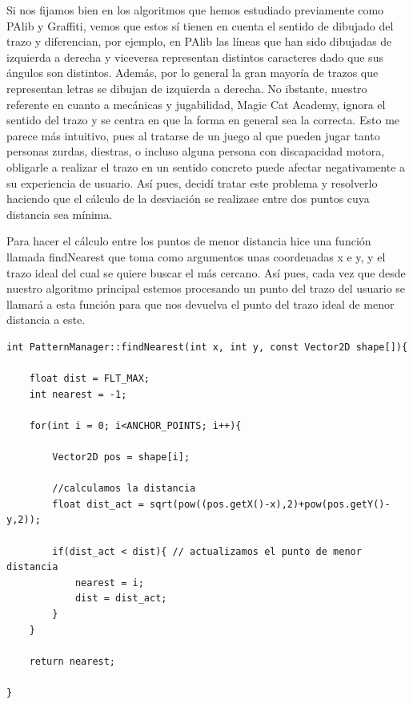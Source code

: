 \vspace{0.5cm}

Si nos fijamos bien en los algoritmos que hemos estudiado previamente como PAlib y Graffiti, vemos que estos sí tienen en cuenta el sentido de dibujado del trazo y diferencian, por ejemplo, en PAlib las líneas que han sido dibujadas de izquierda a derecha y viceversa representan distintos caracteres dado que sus ángulos son distintos. Además, por lo general la gran mayoría de trazos que representan letras se dibujan de izquierda a derecha. No ibstante, nuestro referente en cuanto a mecánicas y jugabilidad, Magic Cat Academy, ignora el sentido del trazo y se centra en que la forma en general sea la correcta. Esto me parece más intuitivo, pues al tratarse de un juego al que pueden jugar tanto personas zurdas, diestras, o incluso alguna persona con discapacidad motora, obligarle a realizar el trazo en un sentido concreto puede afectar negativamente a su experiencia de usuario. Así pues, decidí tratar este problema y resolverlo haciendo que el cálculo de la desviación se realizase entre dos puntos cuya distancia sea mínima.

\vspace{0.5cm}

Para hacer el cálculo entre los puntos de menor distancia hice una función llamada findNearest que toma como argumentos unas coordenadas x e y, y el trazo ideal del cual se quiere buscar el más cercano. Así pues, cada vez que desde nuestro algoritmo principal estemos procesando un punto del trazo del usuario se llamará a esta función para que nos devuelva el punto del trazo ideal de menor distancia a este.

\vspace{0.5cm}

\begin{lstlisting}[caption={Búsqueda del punto más cercano con la función findNearest}, label={code:findNearest}]
int PatternManager::findNearest(int x, int y, const Vector2D shape[]){

	float dist = FLT_MAX;
	int nearest = -1;

	for(int i = 0; i<ANCHOR_POINTS; i++){

		Vector2D pos = shape[i];

        //calculamos la distancia
		float dist_act = sqrt(pow((pos.getX()-x),2)+pow(pos.getY()-y,2));

		if(dist_act < dist){ // actualizamos el punto de menor distancia
			nearest = i;
			dist = dist_act;
		}
	}

	return nearest;

}
\end{lstlisting}

